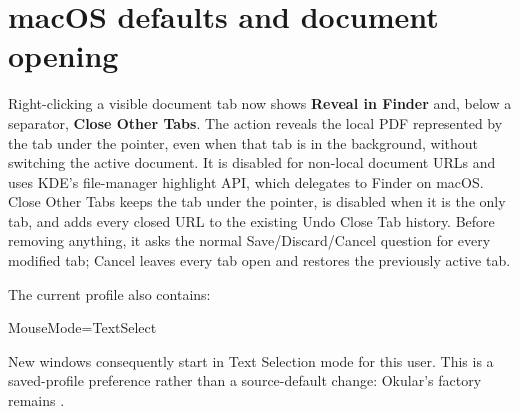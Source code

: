 \section*{macOS defaults and document opening}
Right-clicking a visible document tab now shows \textbf{Reveal in Finder} and, below a separator, \textbf{Close Other Tabs}.
The action reveals the local PDF represented by the tab under the pointer, even when that tab is in the background, without switching the active document.
It is disabled for non-local document URLs and uses KDE's file-manager highlight API, which delegates to Finder on macOS.
Close Other Tabs keeps the tab under the pointer, is disabled when it is the only tab, and adds every closed URL to the existing Undo Close Tab history.
Before removing anything, it asks the normal Save/Discard/Cancel question for every modified tab; Cancel leaves every tab open and restores the previously active tab.

The current profile also contains:
\begin{DocCode}
[PageView]
MouseMode=TextSelect
\end{DocCode}
New windows consequently start in Text Selection mode for this user.
This is a saved-profile preference rather than a source-default change: Okular's factory  remains .


